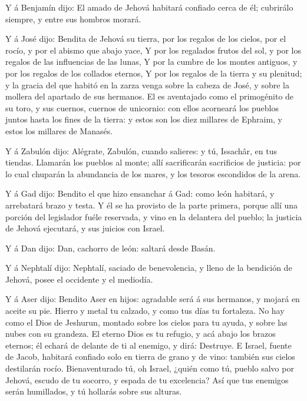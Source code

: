  Y á Benjamín dijo: El amado de Jehová habitará confiado
cerca de él; cubrirálo siempre, y entre sus hombros morará.

 Y á José dijo: Bendita de Jehová su tierra, por los
regalos de los cielos, por el rocío, y por el abismo que abajo yace,
 Y por los regalados frutos del sol, y por los regalos de
las influencias de las lunas,  Y por la cumbre de los
montes antiguos, y por los regalos de los collados eternos,
 Y por los regalos de la tierra y su plenitud; y la gracia
del que habitó en la zarza venga sobre la cabeza de José, y sobre la
mollera del apartado de sus hermanos.  El es aventajado
como el primogénito de su toro, y sus cuernos, cuernos de unicornio: con
ellos acorneará los pueblos juntos hasta los fines de la tierra: y estos
son los diez millares de Ephraim, y estos los millares de Manasés.

 Y á Zabulón dijo: Alégrate, Zabulón, cuando salieres: y
tú, Issachâr, en tus tiendas.  Llamarán los pueblos al
monte; allí sacrificarán sacrificios de justicia: por lo cual chuparán
la abundancia de los mares, y los tesoros escondidos de la arena.

 Y á Gad dijo: Bendito el que hizo ensanchar á Gad: como
león habitará, y arrebatará brazo y testa.  Y él se ha
provisto de la parte primera, porque allí una porción del legislador
fuéle reservada, y vino en la delantera del pueblo; la justicia de
Jehová ejecutará, y sus juicios con Israel.

 Y á Dan dijo: Dan, cachorro de león: saltará desde Basán.

 Y á Nephtalí dijo: Nephtalí, saciado de benevolencia, y
lleno de la bendición de Jehová, posee el occidente y el mediodía.

 Y á Aser dijo: Bendito Aser en hijos: agradable será á sus
hermanos, y mojará en aceite su pie.  Hierro y metal tu
calzado, y como tus días tu fortaleza.  No hay como el Dios
de Jeshurun, montado sobre los cielos para tu ayuda, y sobre las nubes
con su grandeza.  El eterno Dios es tu refugio, y acá abajo
los brazos eternos; él echará de delante de ti al enemigo, y dirá:
Destruye.  E Israel, fuente de Jacob, habitará confiado
solo en tierra de grano y de vino: también sus cielos destilarán rocío.
 Bienaventurado tú, oh Israel, ¿quién como tú, pueblo salvo
por Jehová, escudo de tu socorro, y espada de tu excelencia? Así que tus
enemigos serán humillados, y tú hollarás sobre sus alturas.

